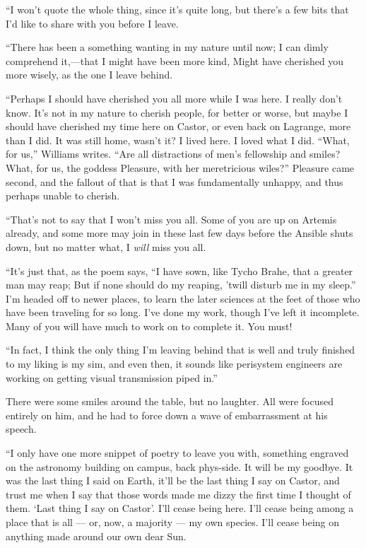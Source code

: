 ``I won't quote the whole thing, since it's quite long, but there's a few bits that I'd like to share with you before I leave.

``There has been a something wanting in my nature until now; I can dimly comprehend it,—that I might have been more kind, Might have cherished you more wisely, as the one I leave behind.

``Perhaps I should have cherished you all more while I was here. I really don't know. It's not in my nature to cherish people, for better or worse, but maybe I should have cherished my time here on Castor, or even back on Lagrange, more than I did. It was still home, wasn't it? I lived here. I loved what I did. ``What, for us,'' Williams writes. ``Are all distractions of men's fellowship and smiles? What, for us, the goddess Pleasure, with her meretricious wiles?'' Pleasure came second, and the fallout of that is that I was fundamentally unhappy, and thus perhaps unable to cherish.

``That's not to say that I won't miss you all. Some of you are up on Artemis already, and some more may join in these last few days before the Ansible shuts down, but no matter what, I \emph{will} miss you all.

``It's just that, as the poem says, ``I have sown, like Tycho Brahe, that a greater man may reap; But if none should do my reaping, 'twill disturb me in my sleep.'' I'm headed off to newer places, to learn the later sciences at the feet of those who have been traveling for so long. I've done my work, though I've left it incomplete. Many of you will have much to work on to complete it. You must!

``In fact, I think the only thing I'm leaving behind that is well and truly finished to my liking is my sim, and even then, it sounds like perisystem engineers are working on getting visual transmission piped in.''

There were some smiles around the table, but no laughter. All were focused entirely on him, and he had to force down a wave of embarrassment at his speech.

``I only have one more snippet of poetry to leave you with, something engraved on the astronomy building on campus, back phys-side. It will be my goodbye. It was the last thing I said on Earth, it'll be the last thing I say on Castor, and trust me when I say that those words made me dizzy the first time I thought of them. `Last thing I say on Castor'. I'll cease being here. I'll cease being among a place that is all — or, now, a majority — my own species. I'll cease being on anything made around our own dear Sun.

